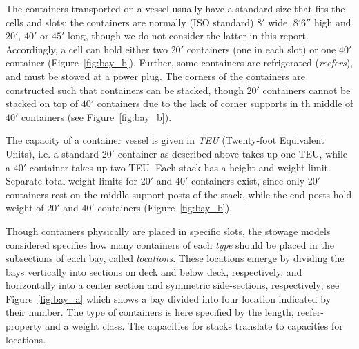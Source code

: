 The containers transported on a vessel usually have a standard size that fits the cells and slots; the containers are normally (ISO standard) $8'$ wide, $8'6''$ high and $20'$,
$40'$ or $45'$ long, though we do not consider the latter in this report. Accordingly, a cell can hold either two $20'$ containers (one in each slot) or one $40'$ container (Figure~\ref{fig:bay_b}). Further, some containers are refrigerated (\emph{reefers}), and must be stowed at a power plug. 
The corners of the containers are constructed such that containers can be stacked, though $20'$ containers cannot
be stacked on top of $40'$ containers due to the lack of corner supports in th middle of $40'$ containers (see Figure~\ref{fig:bay_b}). 

The capacity of a container vessel is given in \emph{TEU} (Twenty-foot Equivalent Units), i.e. a standard $20'$ container as described above takes up one TEU, while a $40'$ container takes up two TEU. Each stack has a height and weight limit. Separate total weight limits for $20'$ and $40'$ containers exist, since only $20'$ containers rest on the middle support posts of the stack, while the end posts hold weight of $20'$ and $40'$ containers (Figure~\ref{fig:bay_b}). 

Though containers physically are placed in specific slots, the stowage models considered {specifies} how many containers of each \emph{type} should be placed in the subsections of each bay, called \emph{locations}. 
These locations emerge by dividing the bays {vertically} into sections on deck and below deck, respectively, and {horizontally} into a center section and symmetric side-sections, respectively; see Figure~\ref{fig:bay_a} which shows a bay divided into four location indicated by their number. The type of containers is here specified by the length, reefer-property and a weight class. The capacities for stacks translate to capacities for locations.

